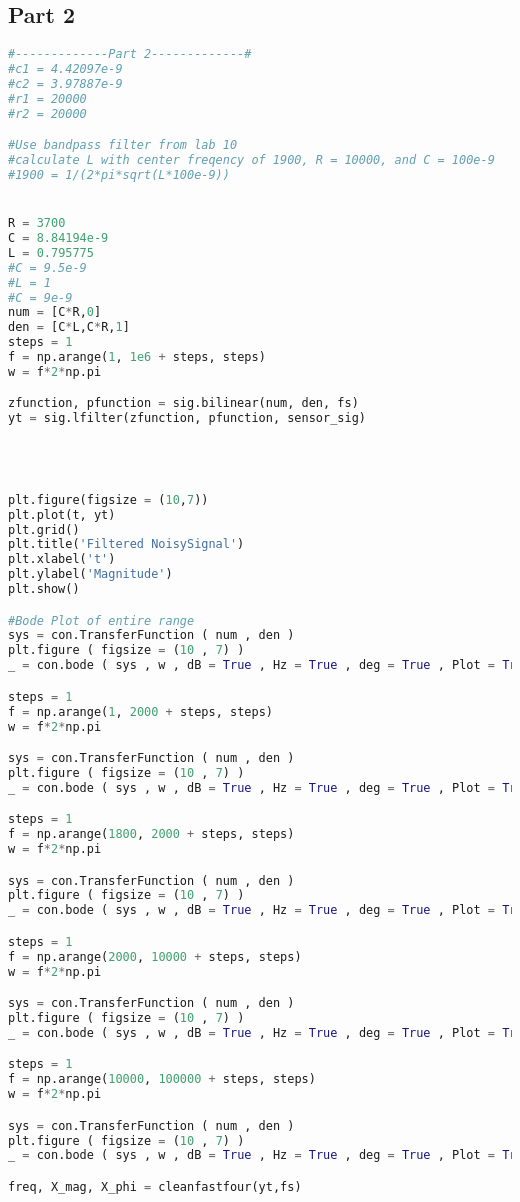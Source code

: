 \documentclass[11pt,a4]{report}
\begin{document}
\subsection{Part 2}
\begin{lstlisting}[language=Python]
#-------------Part 2-------------#
#c1 = 4.42097e-9
#c2 = 3.97887e-9
#r1 = 20000
#r2 = 20000

#Use bandpass filter from lab 10
#calculate L with center freqency of 1900, R = 10000, and C = 100e-9
#1900 = 1/(2*pi*sqrt(L*100e-9))


R = 3700
C = 8.84194e-9
L = 0.795775
#C = 9.5e-9
#L = 1
#C = 9e-9
num = [C*R,0]
den = [C*L,C*R,1]
steps = 1
f = np.arange(1, 1e6 + steps, steps)
w = f*2*np.pi

zfunction, pfunction = sig.bilinear(num, den, fs)
yt = sig.lfilter(zfunction, pfunction, sensor_sig)




plt.figure(figsize = (10,7))
plt.plot(t, yt)
plt.grid()
plt.title('Filtered NoisySignal')
plt.xlabel('t')
plt.ylabel('Magnitude')
plt.show()

#Bode Plot of entire range
sys = con.TransferFunction ( num , den )
plt.figure ( figsize = (10 , 7) )
_ = con.bode ( sys , w , dB = True , Hz = True , deg = True , Plot = True )

steps = 1
f = np.arange(1, 2000 + steps, steps)
w = f*2*np.pi

sys = con.TransferFunction ( num , den )
plt.figure ( figsize = (10 , 7) )
_ = con.bode ( sys , w , dB = True , Hz = True , deg = True , Plot = True )

steps = 1
f = np.arange(1800, 2000 + steps, steps)
w = f*2*np.pi

sys = con.TransferFunction ( num , den )
plt.figure ( figsize = (10 , 7) )
_ = con.bode ( sys , w , dB = True , Hz = True , deg = True , Plot = True )

steps = 1
f = np.arange(2000, 10000 + steps, steps)
w = f*2*np.pi

sys = con.TransferFunction ( num , den )
plt.figure ( figsize = (10 , 7) )
_ = con.bode ( sys , w , dB = True , Hz = True , deg = True , Plot = True )

steps = 1
f = np.arange(10000, 100000 + steps, steps)
w = f*2*np.pi

sys = con.TransferFunction ( num , den )
plt.figure ( figsize = (10 , 7) )
_ = con.bode ( sys , w , dB = True , Hz = True , deg = True , Plot = True )

freq, X_mag, X_phi = cleanfastfour(yt,fs)


\end{lstlisting}
\end{document}
